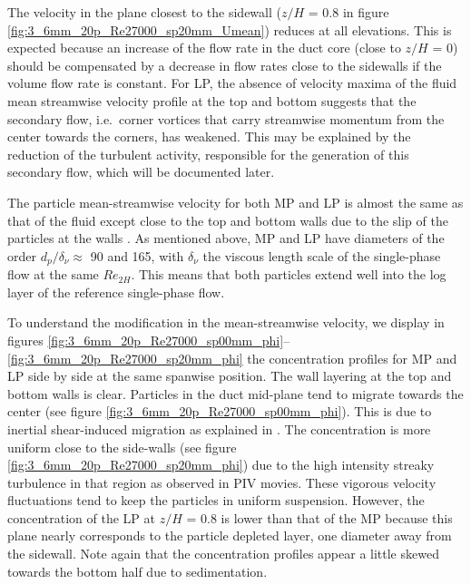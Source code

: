 \documentclass{jfm}
\begin{document}
The velocity in the plane closest to the sidewall ($z/H$ = 0.8 in figure \ref{fig:3_6mm_20p_Re27000_sp20mm_Umean}) reduces at all elevations. This is expected because an increase of the flow rate in the duct core (close to $z/H$ = 0)
should be compensated by a decrease in flow rates close to the sidewalls if the volume flow rate is constant. 
For LP, 
the absence of velocity maxima of the fluid mean streamwise velocity profile at the top and bottom suggests that the secondary flow, i.e.\ corner vortices that carry streamwise momentum from the center towards the corners, has weakened. This may be explained by the reduction of  the turbulent activity, responsible for the generation of this secondary flow, which will be documented later. 


The particle mean-streamwise velocity for both MP and LP is almost the same as that of the fluid except close to the top and bottom walls due to the slip of the particles at the walls \cite[also seen in the simulations by][]{picano2015turbulent,costa2016universal}. As mentioned above,  MP and LP have diameters of the order $d_p/\delta_{\nu}\approx$ 90 and 165, with $\delta_{\nu}$ the viscous length scale of the single-phase flow at the same $Re_{2H}$. This means that both particles extend well into the log layer of the reference single-phase flow. 

To understand the modification in the mean-streamwise velocity, we display
in figures \ref{fig:3_6mm_20p_Re27000_sp00mm_phi}--\ref{fig:3_6mm_20p_Re27000_sp20mm_phi} the concentration profiles for MP and LP side by side at the same spanwise position. 
The wall layering at the top and bottom walls is clear.
Particles in the duct mid-plane tend to migrate towards the center (see figure \ref{fig:3_6mm_20p_Re27000_sp00mm_phi}). This is due to inertial shear-induced migration as explained in \citet{fornari2016effect}. The concentration is more uniform close to the side-walls (see figure \ref{fig:3_6mm_20p_Re27000_sp20mm_phi}) due to the high intensity streaky turbulence in that region as observed in PIV movies. These vigorous velocity fluctuations tend to keep the particles in uniform suspension. However, the concentration of the LP at $z/H$ = 0.8 is lower than that of the MP because this plane nearly corresponds to the particle depleted layer, one diameter away from the sidewall. Note again that the concentration profiles appear a little skewed towards the bottom half due to sedimentation.
\end{document}
